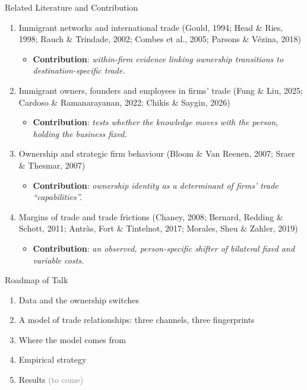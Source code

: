 \documentclass[notes,11pt, aspectratio=169]{beamer}
\begin{document}
\begin{frame}{Related Literature and Contribution}
\vspace{0.1cm}
\small
\begin{enumerate}\setlength{\itemsep}{4pt}
    \item Immigrant networks and international trade (Gould, 1994; Head \& Ries, 1998; Rauch \& Trindade, 2002; Combes et al., 2005; Parsons \& V\'ezina, 2018)
    \begin{itemize}
      \item \textbf{Contribution}: \textit{within-firm evidence linking ownership transitions to destination-specific trade.}
    \end{itemize}
    \item Immigrant owners, founders and employees in firms' trade (Fung \& Liu, 2025; Cardoso \& Ramanarayanan, 2022; Chikis \& Saygin, 2026)
    \begin{itemize}
      \item \textbf{Contribution}: \textit{tests whether the knowledge moves with the person, holding the business fixed.}
    \end{itemize}
    \item Ownership and strategic firm behaviour (Bloom \& Van Reenen, 2007; Sraer \& Thesmar, 2007)
    \begin{itemize}
      \item \textbf{Contribution}: \textit{ownership identity as a determinant of firms' trade ``capabilities''.}
    \end{itemize}
    \item Margins of trade and trade frictions (Chaney, 2008; Bernard, Redding \& Schott, 2011; Antr\`as, Fort \& Tintelnot, 2017; Morales, Sheu \& Zahler, 2019)
    \begin{itemize}
      \item \textbf{Contribution}: \textit{an observed, person-specific shifter of bilateral fixed and variable costs.}
    \end{itemize}
\end{enumerate}
\end{frame}


\begin{frame}{Roadmap of Talk}
\begin{enumerate}\setlength{\itemsep}{8pt}
\item Data and the ownership switches
\item A model of trade relationships: three channels, three fingerprints
\item Where the model comes from
\item Empirical strategy
\item Results \textcolor{gray}{(to come)}
\end{enumerate}
\end{frame}
\end{document}
